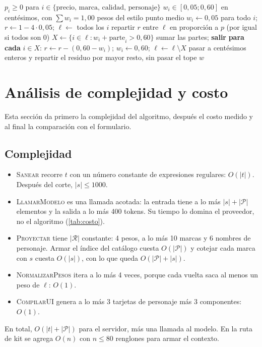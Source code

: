 \documentclass[11pt,letterpaper]{article}
\newcommand{\R}{\mathcal{R}}
\begin{document}
\begin{algorithm}[ht]
\caption{\textsc{NormalizarPesos}$(p)$}\label{alg:pesos}
\begin{algorithmic}[1]
\Require $p_i\ge 0$ para $i\in\{\text{precio, marca, calidad, personaje}\}$
\Ensure $w_i\in[0{,}05;0{,}60]$ en cent\'esimos, con $\sum w_i=1{,}00$
 \State \Return pesos del estilo punto medio \EndIf
\State $w_i\gets 0{,}05$ para todo $i$; $r\gets 1-4\cdot0{,}05$; $\ell\gets$ todos los $i$
  \State repartir $r$ entre $\ell$ en proporci\'on a $p$ (por igual si todos son 0)
  \State $X\gets\{i\in\ell: w_i+\text{parte}_i>0{,}60\}$
   \State sumar las partes; \textbf{salir} \EndIf
  \State \textbf{para cada} $i\in X$: $r\gets r-(0{,}60-w_i)$; $w_i\gets 0{,}60$; \quad $\ell\gets\ell\setminus X$
\EndWhile
\State pasar a cent\'esimos enteros y repartir el residuo por mayor resto, sin pasar el tope 
\State \Return $w$
\end{algorithmic}
\end{algorithm}

\section{An\'alisis de complejidad y costo}\label{sec:costo}

Esta secci\'on da primero la complejidad del algoritmo, despu\'es el costo medido y al final la comparaci\'on con
el formulario.

\subsection{Complejidad}
\begin{itemize}
  \item \textsc{Sanear} recorre $t$ con un n\'umero constante de expresiones regulares: $O(|t|)$. Despu\'es del
  corte, $|s|\le 1000$.
  \item \textsc{LlamarModelo} es una llamada acotada: la entrada tiene a lo m\'as $|s|+|\mathcal{P}|$ elementos y
  la salida a lo m\'as 400 tokens. Su tiempo lo domina el proveedor, no el algoritmo (\cref{tab:costo}).
  \item \textsc{Proyectar} tiene $|\R|$ constante: 4 pesos, a lo m\'as 10 marcas y 6 nombres de personaje. Armar
  el \'indice del cat\'alogo cuesta $O(|\mathcal{P}|)$ y cotejar cada marca con $s$ cuesta $O(|s|)$, con
  lo que queda $O(|\mathcal{P}|+|s|)$.
  \item \textsc{NormalizarPesos} itera a lo m\'as 4 veces, porque cada vuelta saca al menos un peso de $\ell$:
  $O(1)$.
  \item \textsc{CompilarUI} genera a lo m\'as 3 tarjetas de personaje m\'as 3 componentes: $O(1)$.
\end{itemize}
En total, $O(|t|+|\mathcal{P}|)$ para el servidor, m\'as una llamada al modelo. En la ruta de kit se agrega
$O(n)$ con $n\le 80$ renglones para armar el contexto.
\end{document}

